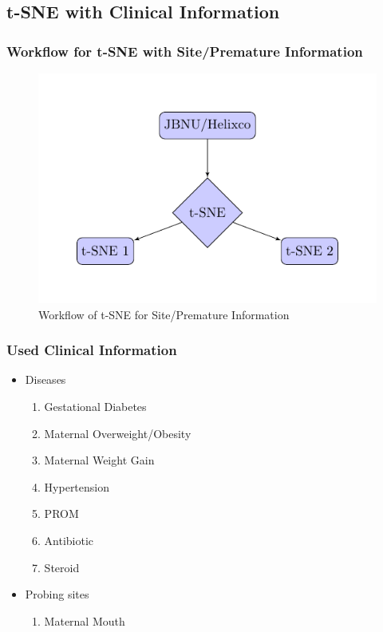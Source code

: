 \documentclass{beamer}
\begin{document}
    \subsection{t-SNE with Clinical Information}
    \begin{frame}
        \frametitle{Workflow for t-SNE with Site/Premature Information}

        \begin{figure}
            \includegraphics[width=0.6 \linewidth]{figures/tikz/site.pdf}
            \caption{Workflow of t-SNE for Site/Premature Information}
        \end{figure}
    \end{frame}

    \begin{frame}
        \frametitle{Used Clinical Information}

        \begin{itemize}
            \item Diseases
            \begin{enumerate}
                \item Gestational Diabetes
                \item Maternal Overweight/Obesity
                \item Maternal Weight Gain
                \item Hypertension
                \item PROM
                \item Antibiotic
                \item Steroid
            \end{enumerate}

        \item Probing sites
        \begin{enumerate}
            \item Maternal Mouth
        \end{enumerate}
        \end{itemize}
    \end{frame}
\end{document}
